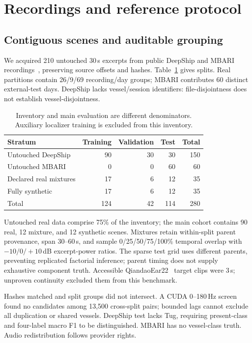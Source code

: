 \documentclass[runningheads,orivec]{llncs}
\begin{document}
\section{Recordings and reference protocol}
\subsection{Contiguous scenes and auditable grouping}
We acquired 210 untouched 30\,s excerpts from public DeepShip and MBARI recordings~\cite{deepshipdata,mbari}, preserving source offsets and hashes. Table~\ref{tab:data} gives splits. Real partitions contain 26/9/69 recording/day groups; MBARI contributes 60 distinct external-test days. DeepShip lacks vessel/session identifiers: file-disjointness does not establish vessel-disjointness.

\begin{table}[tb]
\caption{Inventory and main evaluation are different denominators. Auxiliary localizer training is excluded from this inventory.}
\label{tab:data}\centering\small
\begin{tabular}{@{}lrrrr@{}}\toprule
Stratum & Training & Validation & Test & Total \\\midrule
Untouched DeepShip & 90 & 30 & 30 & 150 \\
Untouched MBARI & 0 & 0 & 60 & 60 \\
Declared real mixtures & 17 & 6 & 12 & 35 \\
Fully synthetic & 17 & 6 & 12 & 35 \\\midrule
Total & 124 & 42 & 114 & 280 \\\bottomrule
\end{tabular}
\end{table}

Untouched real data comprise 75\% of the inventory; the main cohort contains 90 real, 12 mixture, and 12 synthetic scenes. Mixtures retain within-split parent provenance, span 30--60\,s, and sample 0/25/50/75/100\% temporal overlap with $-10/0/+10$\,dB excerpt-power ratios. The sparse test grid uses different parents, preventing replicated factorial inference; parent timing does not supply exhaustive component truth. Accessible QiandaoEar22~\cite{du2024qiandao} target clips were 3\,s; unproven continuity excluded them from this benchmark.

Hashes matched and split groups did not intersect. A CUDA 0--180\,Hz screen found no candidates among 13,500 cross-split pairs; bounded lags cannot exclude all duplication or shared vessels. DeepShip test lacks Tug, requiring present-class and four-label macro F1 to be distinguished. MBARI has no vessel-class truth. Audio redistribution follows provider rights.
\end{document}
